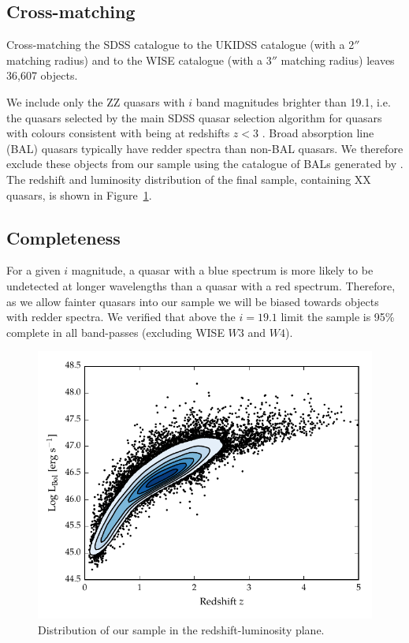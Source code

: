 \subsection{Cross-matching}

Cross-matching the SDSS catalogue to the UKIDSS catalogue (with a 2$''$ matching radius) and to the WISE catalogue (with a 3$''$ matching radius) leaves 36,607 objects. 

We include only the ZZ quasars with $i$ band magnitudes brighter than 19.1, i.e. the quasars selected by the main SDSS quasar selection algorithm for quasars with colours consistent with being at redshifts $z < 3$ \citep{richards02}. 
Broad absorption line (BAL) quasars typically have redder spectra than non-BAL quasars. 
We therefore exclude these objects from our sample using the catalogue of BALs generated by \citet{allen11}. 
The redshift and luminosity distribution of the final sample, containing XX quasars, is shown in Figure~\ref{fig:lum_z}. 

\subsection{Completeness}

For a given $i$ magnitude, a quasar with a blue spectrum is more likely to be undetected at longer wavelengths than a quasar with a red spectrum. 
Therefore, as we allow fainter quasars into our sample we will be biased towards objects with redder spectra.
We verified that above the $i=19.1$ limit the sample is 95\% complete in all band-passes (excluding WISE $W3$ and $W4$).

\begin{figure}
  \centering
  \includegraphics[width=\textwidth]{figures/chapter05/lum_z.pdf}
  \caption[{Distribution of our sample in the redshift-luminosity plane.}]{Distribution of our sample in the redshift-luminosity plane. }
  \label{fig:lum_z}
\end{figure}


